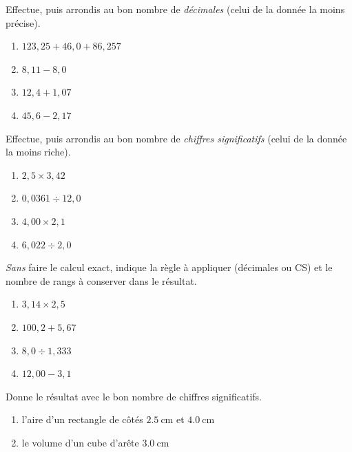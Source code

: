 \documentclass[11pt,a4paper]{article}
\begin{document}
\begin{exo}
Effectue, puis arrondis au bon nombre de \emph{décimales} (celui de la donnée la moins précise).
\begin{enumerate}[label=\alph*)]
  \item $123,25 + 46,0 + 86,257$
  \item $8,11 - 8,0$
  \item $12,4 + 1,07$
  \item $45,6 - 2,17$
\end{enumerate}
\end{exo}

\begin{exo}
Effectue, puis arrondis au bon nombre de \emph{chiffres significatifs} (celui de la donnée la moins riche).
\begin{enumerate}[label=\alph*)]
  \item $2,5 \times 3,42$
  \item $0,0361 \div 12,0$
  \item $4,00 \times 2,1$
  \item $6,022 \div 2,0$
\end{enumerate}
\end{exo}

\begin{exo}
\emph{Sans} faire le calcul exact, indique la règle à appliquer (décimales ou CS) et le nombre de rangs
à conserver dans le résultat.
\begin{enumerate}[label=\alph*)]
  \item $3,14 \times 2,5$
  \item $100,2 + 5,67$
  \item $8,0 \div 1,333$
  \item $12,00 - 3,1$
\end{enumerate}
\end{exo}

\begin{exo}
Donne le résultat avec le bon nombre de chiffres significatifs.
\begin{enumerate}[label=\alph*)]
  \item l'aire d'un rectangle de côtés $\qty{2,5}{\centi\metre}$ et $\qty{4,0}{\centi\metre}$
  \item le volume d'un cube d'arête $\qty{3,0}{\centi\metre}$
\end{enumerate}
\end{exo}
\end{document}
